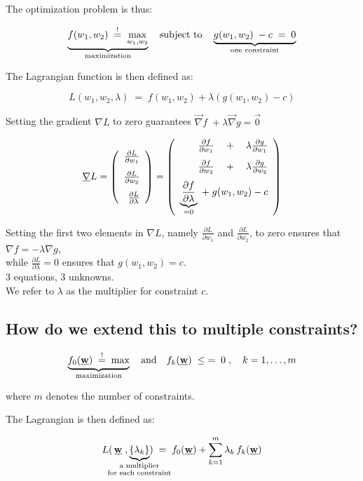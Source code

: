 \begin{frame}
The optimization problem is thus:

\begin{equation}
\underbrace{f(w_1, w_2) \;\stackrel{\mathrm{!}}{=}\; \max_{w_{1},w_{2}}}_{\text{maximization}} \quad  \text{subject to} \quad \underbrace{g(w_1,w_2)\;-c\; = \; 0}_{\text{one constraint}}
\end{equation}

\newpage
The Lagrangian function is then defined as:

$$
L(w_1, w_2, \lambda) \; = \; f(w_1,w_2) + \lambda(g(w_1, w_2)-c)
$$

Setting the gradient $\nabla L$ to zero guarantees $\vec \nabla f \;  + \lambda \vec \nabla g = \vec 0$

$$
\underline{\mathbf{\nabla}} L = 
\left( \begin{array}{rrrrrrrrrrrrrrrrrrrrrrrrrr} 
	\frac{\partial L}{\partial w_1} \\[0.3cm]
	\frac{\partial L}{\partial w_2} \\[0.3cm]
	\frac{\partial L}{\partial \lambda}
	\\ \end{array} \right)
=
\left( \begin{array}{rrrrrrrrrrrrrrrrrrrrrrrrrr} 
	\frac{\partial f}{\partial w_1} \quad+\quad \lambda \frac{\partial g}{\partial w_1} \\[0.3cm]
	\frac{\partial f}{\partial w_2} \quad+\quad \lambda \frac{\partial g}{\partial w_2} \\[0.3cm]
	\underbrace{\frac{\partial f}{\partial \lambda}}_{=0} \;+\; g(w_1, w_2)-c
	\\ \end{array} \right)
$$

Setting the first two elements in $\nabla L$, namely $\frac{\partial L}{\partial w_1}$ and $\frac{\partial L}{\partial w_2}$, to zero ensures that $\nabla f = -\lambda \nabla g$,\\
while $\frac{\partial L}{\partial \lambda}=0$ ensures that $g(w_1, w_2) = c$.\\

3 equations, 3 unknowns.\\

We refer to $\lambda$ as the multiplier for constraint $c$.


\subsection{How do we extend this to multiple constraints?}

$$
\underbrace{f_0(\underline{\mathbf{w}}) \;\stackrel{\mathrm{!}}{=}\; \text{max}}_{\text{maximization}} \quad  \text{and} \quad f_k(\underline{\mathbf{w}})\;\le\; = \; 0 \;, \quad k = 1,\ldots,m
$$

where $m$ denotes the number of constraints.

The Lagrangian is then defined as:

$$
L(\,\vec w\;, \underbrace{\{\lambda_k\}}_{
\mathclap{
\substack{\text{a multiplier} \\
\text{for each constraint}}
}
}) \; = \; f_0(\vec w) + \sum_{k=1}^{m} \lambda_k \, f_k(\vec w)
$$


\end{frame}

